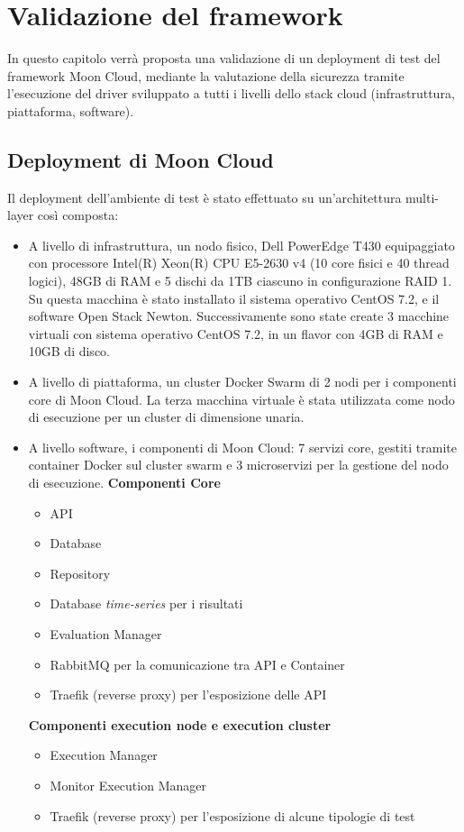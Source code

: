 \documentclass[../main.tex]{subfiles}
\begin{document}
\chapter{Validazione del framework}
In questo capitolo verrà proposta una validazione di un deployment di test del framework Moon Cloud, mediante la valutazione della sicurezza tramite l'esecuzione del driver sviluppato a tutti i livelli dello stack cloud (infrastruttura, piattaforma, software). 

\section{Deployment di Moon Cloud}

Il deployment dell'ambiente di test è stato effettuato su un'architettura multi-layer così composta:
\begin{itemize}
    \item A livello di infrastruttura, un nodo fisico, Dell PowerEdge T430 equipaggiato con processore Intel(R) Xeon(R) CPU E5-2630 v4 (10 core fisici e 40 thread logici), 48GB di RAM e 5 dischi da 1TB ciascuno in configurazione RAID 1. Su questa macchina è stato installato il sistema operativo CentOS 7.2, e il software Open Stack Newton.
        Successivamente sono state create 3 macchine virtuali con sistema operativo CentOS 7.2, in un flavor con 4GB di RAM e 10GB di disco.
    \item A livello di piattaforma, un cluster Docker Swarm di 2 nodi per i componenti core di Moon Cloud. La terza macchina virtuale è stata utilizzata come nodo di esecuzione per un cluster di dimensione unaria.
    \item A livello software, i componenti di Moon Cloud: 7 servizi core, gestiti tramite container Docker sul cluster swarm e 3 microservizi per la gestione del nodo di esecuzione.
        \textbf{Componenti Core}
        \begin{itemize}
            \item API
            \item Database
            \item Repository
            \item Database \textit{time-series} per i risultati
            \item Evaluation Manager
            \item RabbitMQ per la comunicazione tra API e Container
            \item Traefik (reverse proxy) per l'esposizione delle API
        \end{itemize}
        \textbf{Componenti execution node e execution cluster}
        \begin{itemize}
            \item Execution Manager
            \item Monitor Execution Manager
            \item Traefik (reverse proxy) per l'esposizione di alcune tipologie di test
        \end{itemize}
\end{itemize}
\end{document}
